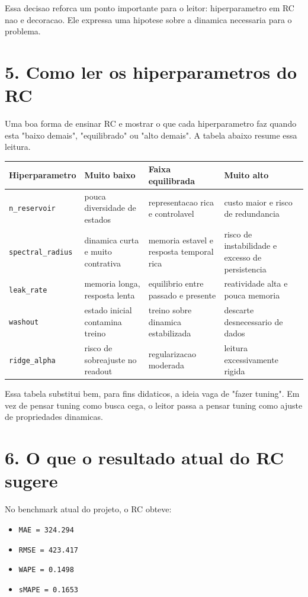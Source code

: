 \documentclass[12pt]{article}
\providecommand{\tightlist}{%
  \setlength{\itemsep}{0pt}\setlength{\parskip}{0pt}}
\begin{document}
Essa decisao reforca um ponto importante para o leitor: hiperparametro em RC nao e decoracao. Ele expressa uma hipotese sobre a dinamica necessaria para o problema.

\section{5. Como ler os hiperparametros do RC}\label{5-como-ler-os-hiperparametros-do-rc}

Uma boa forma de ensinar RC e mostrar o que cada hiperparametro faz quando esta "baixo demais", "equilibrado" ou "alto demais". A tabela abaixo resume essa leitura.

\begin{longtable}[]{@{}llll@{}}
\toprule\noalign{}
Hiperparametro & Muito baixo & Faixa equilibrada & Muito alto \\
\midrule\noalign{}
\endhead
\bottomrule\noalign{}
\endlastfoot
\texttt{n\_reservoir} & pouca diversidade de estados & representacao rica e controlavel & custo maior e risco de redundancia \\
\texttt{spectral\_radius} & dinamica curta e muito contrativa & memoria estavel e resposta temporal rica & risco de instabilidade e excesso de persistencia \\
\texttt{leak\_rate} & memoria longa, resposta lenta & equilibrio entre passado e presente & reatividade alta e pouca memoria \\
\texttt{washout} & estado inicial contamina treino & treino sobre dinamica estabilizada & descarte desnecessario de dados \\
\texttt{ridge\_alpha} & risco de sobreajuste no readout & regularizacao moderada & leitura excessivamente rigida \\
\end{longtable}

Essa tabela substitui bem, para fins didaticos, a ideia vaga de "fazer tuning". Em vez de pensar tuning como busca cega, o leitor passa a pensar tuning como ajuste de propriedades dinamicas.

\section{6. O que o resultado atual do RC sugere}\label{6-o-que-o-resultado-atual-do-rc-sugere}

No benchmark atual do projeto, o RC obteve:

\begin{itemize}
\tightlist
\item
  \texttt{MAE\ =\ 324.294}
\item
  \texttt{RMSE\ =\ 423.417}
\item
  \texttt{WAPE\ =\ 0.1498}
\item
  \texttt{sMAPE\ =\ 0.1653}
\end{itemize}
\end{document}
